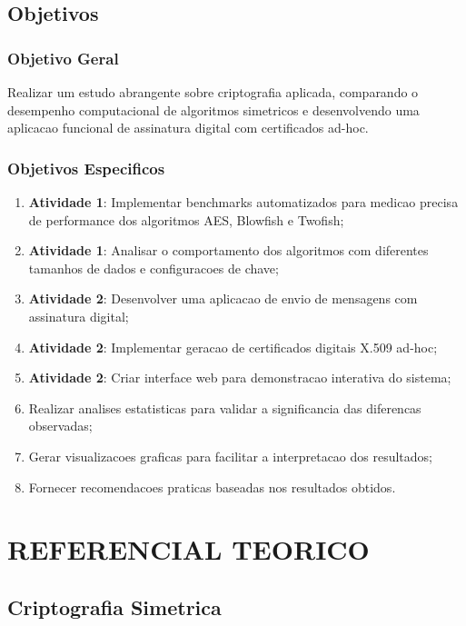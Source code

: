 \documentclass[12pt,a4paper,oneside]{article}
\begin{document}
\subsection{Objetivos}

\subsubsection{Objetivo Geral}

Realizar um estudo abrangente sobre criptografia aplicada, comparando o desempenho computacional de algoritmos simetricos e desenvolvendo uma aplicacao funcional de assinatura digital com certificados ad-hoc.

\subsubsection{Objetivos Especificos}

\begin{enumerate}
    \item \textbf{Atividade 1}: Implementar benchmarks automatizados para medicao precisa de performance dos algoritmos AES, Blowfish e Twofish;
    \item \textbf{Atividade 1}: Analisar o comportamento dos algoritmos com diferentes tamanhos de dados e configuracoes de chave;
    \item \textbf{Atividade 2}: Desenvolver uma aplicacao de envio de mensagens com assinatura digital;
    \item \textbf{Atividade 2}: Implementar geracao de certificados digitais X.509 ad-hoc;
    \item \textbf{Atividade 2}: Criar interface web para demonstracao interativa do sistema;
    \item Realizar analises estatisticas para validar a significancia das diferencas observadas;
    \item Gerar visualizacoes graficas para facilitar a interpretacao dos resultados;
    \item Fornecer recomendacoes praticas baseadas nos resultados obtidos.
\end{enumerate}

\section{REFERENCIAL TEORICO}

\subsection{Criptografia Simetrica}
\end{document}
